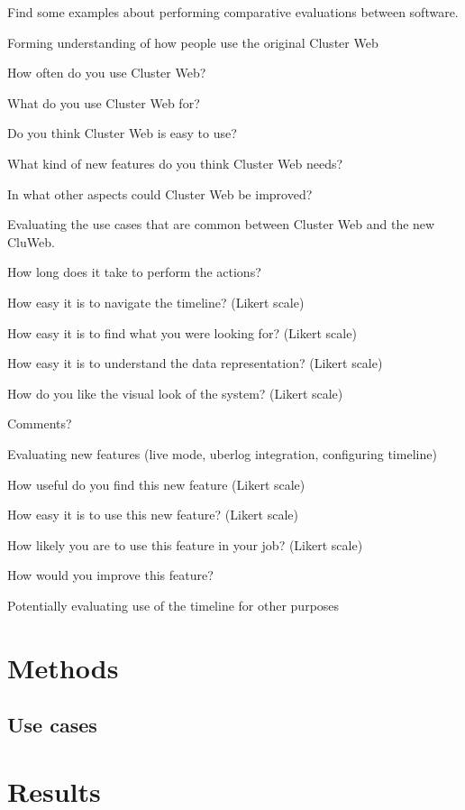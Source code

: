 
Find some examples about performing comparative evaluations between software.

Forming understanding of how people use the original Cluster Web 

How often do you use Cluster Web? 

What do you use Cluster Web for? 

Do you think Cluster Web is easy to use? 

What kind of new  features do you think Cluster Web needs? 

In what other aspects could Cluster Web be improved? 

Evaluating the use cases that are common between Cluster Web and the new CluWeb. 

How long does it take to perform the actions? 

How easy it is to navigate the timeline? (Likert scale) 

How easy it is to find what you were looking for? (Likert scale) 

How easy it is to understand the data representation? (Likert scale) 

How do you like the visual look of the system? (Likert scale) 

Comments? 
 
Evaluating new features (live mode, uberlog integration, configuring timeline) 

How useful do you find this new feature (Likert scale) 

How easy it is to use this new feature? (Likert scale) 

How likely you are to use this feature in your job? (Likert scale) 

How would you improve this feature? 
 
Potentially evaluating use of the timeline for other purposes

\section{Methods}

\subsection{Use cases}

\section{Results}